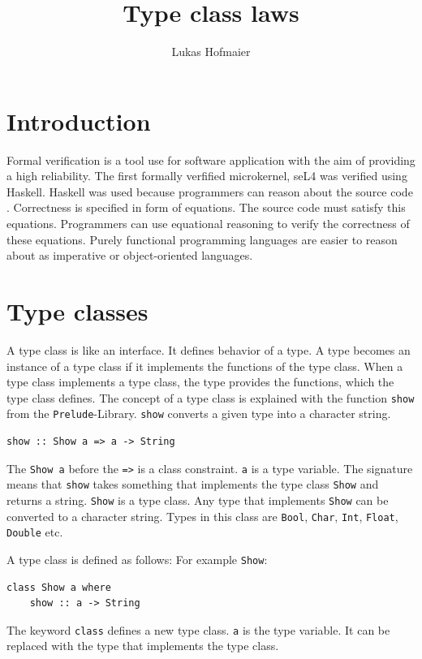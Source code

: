 \documentclass[twoside, a4paper]{article}
\author{Lukas Hofmaier}
\title{Type class laws}
\begin{document}
\maketitle
\tableofcontents

\section{Introduction}
\label{sec:intro}

Formal verification is a tool use for software application with the aim of providing a high reliability. The first formally verfified microkernel, seL4 was verified using Haskell. Haskell was used because programmers can reason about the source code \cite{Klein09}. Correctness is specified in form of equations. The source code must satisfy this equations. Programmers can use equational reasoning to verify the correctness of these equations.
Purely functional programming languages are easier to reason about as imperative or object-oriented languages.

\section{Type classes}
\label{sec:typeclasses}

A type class is like an interface. It defines behavior of a type. A type becomes an instance of a type class if it implements the functions of the type class. When a type class implements a type class, the type provides the functions, which the type class defines.
The concept of a type class is explained with the function \verb|show| from the \verb|Prelude|-Library. \verb|show| converts a given type into a character string.
\begin{verbatim}
show :: Show a => a -> String
\end{verbatim}
The \verb|Show a| before the \verb|=>| is a class constraint. \verb|a| is a type variable. The signature means that \verb|show| takes something that implements the type class \verb|Show| and returns a string. \verb|Show| is a type class. 
Any type that implements \verb|Show| can be converted to a character string. Types in this class are \verb|Bool|, \verb|Char|, \verb|Int|, \verb|Float|, \verb|Double| etc.

A type class is defined as follows: For example \verb|Show|:
\begin{verbatim}
class Show a where
    show :: a -> String
\end{verbatim}
The keyword \verb|class| defines a new type class. \verb|a| is the type variable. It can be replaced with the type that implements the type class.
\end{document}
